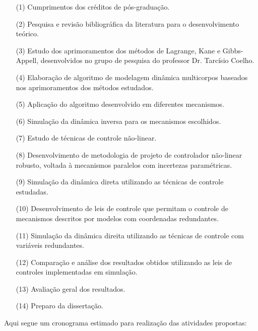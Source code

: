 \documentclass[a4paper,11pt,brazil,fleqn]{article}
\begin{document}
\begin{itemize}
\item[(1)] 	Cumprimentos dos cr\'editos de p\'os-gradua\c{c}\~ao.
\item[(2)] 	Pesquisa e revis\~ao bibliogr\'afica da literatura para o desenvolvimento te\'orico.
\item[(3)] 	Estudo dos aprimoramentos dos m\'etodos de Lagrange, Kane e Gibbs-Appell, desenvolvidos no grupo de pesquisa do professor Dr. Tarc\'isio Coelho.
\item[(4)]  Elabora\c{c}\~ao de algoritmo de modelagem din\^amica multicorpos baseados nos aprimoramentos dos m\'etodos estudados.
\item[(5)] 	Aplica\c{c}\~ao do algoritmo desenvolvido em diferentes mecanismos.
\item[(6)] 	Simula\c{c}\~ao da din\^amica inversa para os mecanismos escolhidos.
\item[(7)]  Estudo de t\'ecnicas de controle n\~ao-linear.
\item[(8)]  Desenvolvimento de metodologia de projeto de controlador n\~ao-linear robusto, voltada \`a mecanismos paralelos com incertezas param\'etricas.
\item[(9)] 	Simula\c{c}\~ao da din\^amica direta utilizando as t\'ecnicas de controle estudadas.
\item[(10)] 	Desenvolvimento de leis de controle que permitam  o controle de mecanismos descritos por modelos  com coordenadas redundantes.
\item[(11)] Simula\c{c}\~ao da din\^amica direita utilizando as t\'ecnicas de controle com vari\'aveis redundantes.
\item[(12)] 	Compara\c{c}\~ao e an\'alise dos resultados obtidos utilizando as leis de controles implementadas em simula\c{c}\~ao.
\item[(13)] 	Avalia\c{c}\~ao geral dos resultados.
\item[(14)] Preparo da disserta\c{c}\~ao.
\end{itemize}

Aqui segue um cronograma estimado para realiza\c{c}\~ao das atividades propostas:
\end{document}
